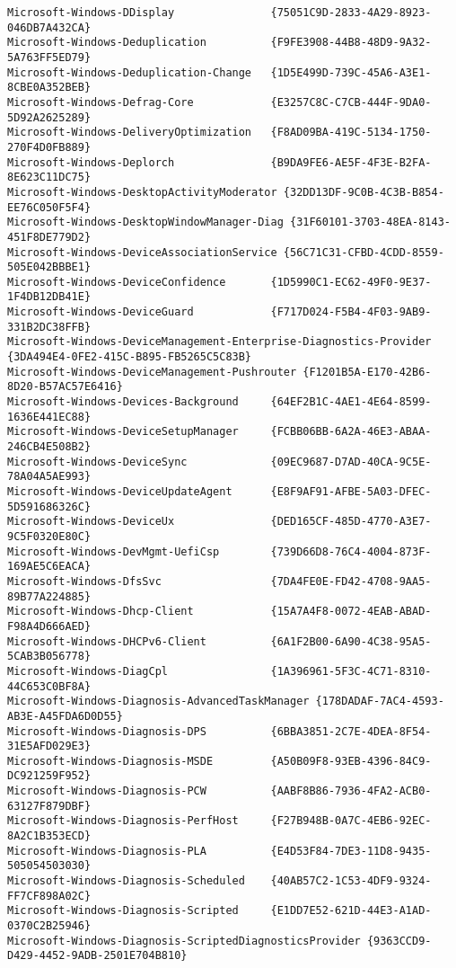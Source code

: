 \documentclass{report}
\begin{document}
\begin{lstlisting}[breaklines=true,basicstyle=\tiny]
Microsoft-Windows-DDisplay               {75051C9D-2833-4A29-8923-046DB7A432CA}
Microsoft-Windows-Deduplication          {F9FE3908-44B8-48D9-9A32-5A763FF5ED79}
Microsoft-Windows-Deduplication-Change   {1D5E499D-739C-45A6-A3E1-8CBE0A352BEB}
Microsoft-Windows-Defrag-Core            {E3257C8C-C7CB-444F-9DA0-5D92A2625289}
Microsoft-Windows-DeliveryOptimization   {F8AD09BA-419C-5134-1750-270F4D0FB889}
Microsoft-Windows-Deplorch               {B9DA9FE6-AE5F-4F3E-B2FA-8E623C11DC75}
Microsoft-Windows-DesktopActivityModerator {32DD13DF-9C0B-4C3B-B854-EE76C050F5F4}
Microsoft-Windows-DesktopWindowManager-Diag {31F60101-3703-48EA-8143-451F8DE779D2}
Microsoft-Windows-DeviceAssociationService {56C71C31-CFBD-4CDD-8559-505E042BBBE1}
Microsoft-Windows-DeviceConfidence       {1D5990C1-EC62-49F0-9E37-1F4DB12DB41E}
Microsoft-Windows-DeviceGuard            {F717D024-F5B4-4F03-9AB9-331B2DC38FFB}
Microsoft-Windows-DeviceManagement-Enterprise-Diagnostics-Provider {3DA494E4-0FE2-415C-B895-FB5265C5C83B}
Microsoft-Windows-DeviceManagement-Pushrouter {F1201B5A-E170-42B6-8D20-B57AC57E6416}
Microsoft-Windows-Devices-Background     {64EF2B1C-4AE1-4E64-8599-1636E441EC88}
Microsoft-Windows-DeviceSetupManager     {FCBB06BB-6A2A-46E3-ABAA-246CB4E508B2}
Microsoft-Windows-DeviceSync             {09EC9687-D7AD-40CA-9C5E-78A04A5AE993}
Microsoft-Windows-DeviceUpdateAgent      {E8F9AF91-AFBE-5A03-DFEC-5D591686326C}
Microsoft-Windows-DeviceUx               {DED165CF-485D-4770-A3E7-9C5F0320E80C}
Microsoft-Windows-DevMgmt-UefiCsp        {739D66D8-76C4-4004-873F-169AE5C6EACA}
Microsoft-Windows-DfsSvc                 {7DA4FE0E-FD42-4708-9AA5-89B77A224885}
Microsoft-Windows-Dhcp-Client            {15A7A4F8-0072-4EAB-ABAD-F98A4D666AED}
Microsoft-Windows-DHCPv6-Client          {6A1F2B00-6A90-4C38-95A5-5CAB3B056778}
Microsoft-Windows-DiagCpl                {1A396961-5F3C-4C71-8310-44C653C0BF8A}
Microsoft-Windows-Diagnosis-AdvancedTaskManager {178DADAF-7AC4-4593-AB3E-A45FDA6D0D55}
Microsoft-Windows-Diagnosis-DPS          {6BBA3851-2C7E-4DEA-8F54-31E5AFD029E3}
Microsoft-Windows-Diagnosis-MSDE         {A50B09F8-93EB-4396-84C9-DC921259F952}
Microsoft-Windows-Diagnosis-PCW          {AABF8B86-7936-4FA2-ACB0-63127F879DBF}
Microsoft-Windows-Diagnosis-PerfHost     {F27B948B-0A7C-4EB6-92EC-8A2C1B353ECD}
Microsoft-Windows-Diagnosis-PLA          {E4D53F84-7DE3-11D8-9435-505054503030}
Microsoft-Windows-Diagnosis-Scheduled    {40AB57C2-1C53-4DF9-9324-FF7CF898A02C}
Microsoft-Windows-Diagnosis-Scripted     {E1DD7E52-621D-44E3-A1AD-0370C2B25946}
Microsoft-Windows-Diagnosis-ScriptedDiagnosticsProvider {9363CCD9-D429-4452-9ADB-2501E704B810}

\end{lstlisting}
\end{document}
